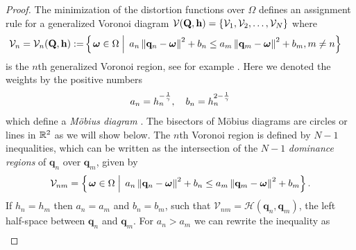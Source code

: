 \documentclass[12pt,onecolumn,journal,draftclsnofoot,letterpaper]{IEEEtran}
\newif\ifarxiv\arxivfalse
\newenvironment{remark}{\par\vspace{1.5ex}\noindent{\em Remark\/}.}{\par\vspace{1.5ex}}
\newcounter{example}[section]
\renewcommand{\vp}{\mathbf q}
\renewcommand{\vP}{\mathbf Q}
\newcommand{\HS}{\ensuremath{\mathcal{H}}}          %
\newcommand{\gP}{\ensuremath{\vP}}          %
\newcommand{\gp}{\ensuremath{\vp}}          %
\newcommand{\bH}{\ensuremath{\vh}}          %
\newcommand{\Vor}{\ensuremath{\mathcal{V}}}         %
\begin{document}
\ifarxiv
\begin{remark}
  It is also possible that two quantization points are equal, but have different parameters. If the parameter
  ratio is very small or very large, one quantization point can become redundant, i.e., if its optimal quantization set is empty.
  In fact, if we optimize over all quantizer points, such a case will be excluded, which we will show for one-dimension
  in \lemref{lemma:allActive}.
\end{remark}
\fi
%
\ifarxiv
\begin{proof}
  The minimization of the distortion functions over $\Omega$ defines an assignment rule for a
  generalized Voronoi diagram $\Vor(\gP,\bH)=\{\Vor_1,\Vor_2,\dots,\Vor_N\}$ where 
  \begin{align}
    \Vor_{n} =\Vor_n(\gP,\bH):=
      &\set{\vome\in\Ome}{ a_n\Norm{\vp_n-\vome}^2 +b_n \leq  a_m\Norm{\vp_m-\vome}^2 +b_m, m\not=n}
  \end{align}
  is the $n$th generalized Voronoi region, see for example \cite[Cha.3]{OBSC00}. Here we denoted the weights by the positive numbers
  \begin{align}
    a_n = h_n^{-\frac{1}{\gamma}}, \quad b_n=h_n^{2-\frac{1}{\gamma}}
  \end{align}
  which define a \emph{M{\"o}bius diagram} \cite{BK06b,BWY07}. The bisectors of M{\"o}bius diagrams are circles or lines
  in ${\mathbb R}^2$ as we will show below.
  The $n$th Voronoi region is defined by $N-1$ inequalities, which  can be written as the intersection of the $N-1$
  \emph{dominance regions} of $\vp_n$ over $\vp_m$, given by 
  \begin{align}
    \Vor_{nm}=\set{\vome\in\Ome}{ a_n\Norm{\vp_n-\vome}^2 +b_n \leq  a_m\Norm{\vp_m-\vome}^2 +b_m}.
  \end{align}
  If $h_n=h_m$ then $a_n=a_m$ and $b_n=b_m$, such that $\Vor_{nm}=\HS(\vp_n,\vp_m)$, the left half-space between $\vp_n$
  and $\vp_m$. For $a_n>a_m$ we can rewrite the inequality as 
  \begin{align*}

\end{align*}
\end{proof}
\end{document}
